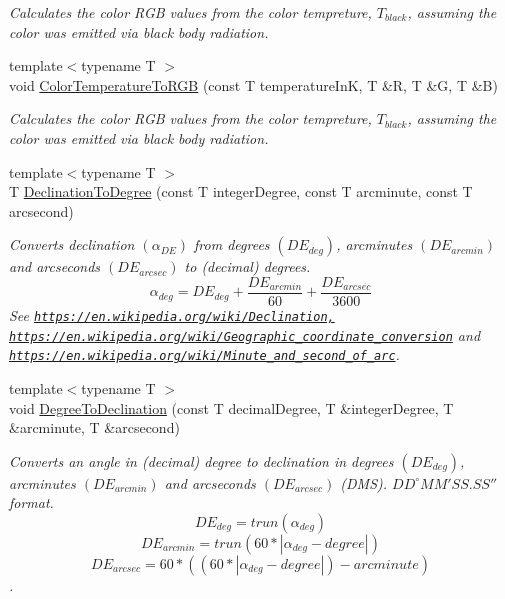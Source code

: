 \begin{DoxyCompactItemize}
\begin{DoxyCompactList}\small\item\em Calculates the color R\+GB values from the color tempreture, $T_{black}$, assuming the color was emitted via black body radiation. \end{DoxyCompactList}\item 
{\footnotesize template$<$typename T $>$ }\\void \mbox{\hyperlink{group___e_g_x_phys-_astrophysics-_color_temperature_ga81db6b5b397c9f788001be73adae032d}{Color\+Temperature\+To\+R\+GB}} (const T temperature\+InK, T \&R, T \&G, T \&B)
\begin{DoxyCompactList}\small\item\em Calculates the color R\+GB values from the color tempreture, $T_{black}$, assuming the color was emitted via black body radiation. \end{DoxyCompactList}\item 
{\footnotesize template$<$typename T $>$ }\\T \mbox{\hyperlink{group___e_g_x_phys-_astrophysics-_declination_ga0c90ea1406801810378d9618553c9a9b}{Declination\+To\+Degree}} (const T integer\+Degree, const T arcminute, const T arcsecond)
\begin{DoxyCompactList}\small\item\em Converts declination $(\alpha_{DE})$ from degrees $(DE_{deg})$, arcminutes $(DE_{arcmin})$ and arcseconds $(DE_{arcsec})$ to (decimal) degrees. \[\alpha_{deg}=DE_{deg} + \frac{DE_{arcmin}}{60} + \frac{DE_{arcsec}}{3600} \] See \href{https://en.wikipedia.org/wiki/Declination,}{\tt https\+://en.\+wikipedia.\+org/wiki/\+Declination,} \href{https://en.wikipedia.org/wiki/Geographic_coordinate_conversion}{\tt https\+://en.\+wikipedia.\+org/wiki/\+Geographic\+\_\+coordinate\+\_\+conversion} and \href{https://en.wikipedia.org/wiki/Minute_and_second_of_arc}{\tt https\+://en.\+wikipedia.\+org/wiki/\+Minute\+\_\+and\+\_\+second\+\_\+of\+\_\+arc}. \end{DoxyCompactList}\item 
{\footnotesize template$<$typename T $>$ }\\void \mbox{\hyperlink{group___e_g_x_phys-_astrophysics-_declination_gaff645fbd9a1de42e9cdbfb37fdac78c9}{Degree\+To\+Declination}} (const T decimal\+Degree, T \&integer\+Degree, T \&arcminute, T \&arcsecond)
\begin{DoxyCompactList}\small\item\em Converts an angle in (decimal) degree to declination in degrees $(DE_{deg})$, arcminutes $(DE_{arcmin})$ and arcseconds $(DE_{arcsec})$ (D\+MS). ${DD}^{\circ}{MM}'{SS.SS}''$ format. \[DE_{deg}=trun(\alpha_{deg})\] \[DE_{arcmin}=trun(60 * |\alpha_{deg} - degree|)\] \[DE_{arcsec}=60 * ((60 * |\alpha_{deg} - degree|)-arcminute)\]. \end{DoxyCompactList}\item 

\end{DoxyCompactItemize}
